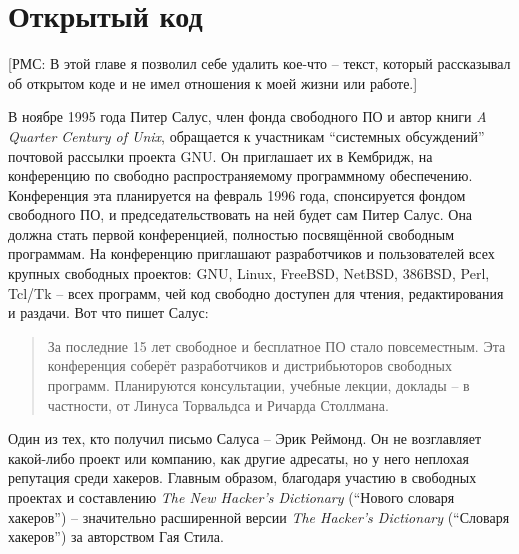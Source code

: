 

\chapter{Открытый код} \label{chapter:open source}

[РМС: В этой главе я позволил себе удалить кое-что -- текст, который рассказывал об открытом коде и не имел отношения к моей жизни или работе.]

В ноябре 1995 года Питер Салус, член фонда свободного ПО и автор книги \textit{A Quarter Century of Unix}, обращается к участникам ``системных обсуждений'' почтовой рассылки проекта GNU. Он приглашает их в Кембридж, на конференцию по свободно распространяемому программному обеспечению. Конференция эта планируется на февраль 1996 года, спонсируется фондом свободного ПО, и председательствовать на ней будет сам Питер Салус. Она должна стать первой конференцией, полностью посвящённой свободным программам. На конференцию приглашают разработчиков и пользователей всех крупных свободных проектов: GNU, Linux, FreeBSD, NetBSD, 386BSD, Perl, Tcl/Tk -- всех программ, чей код свободно доступен для чтения, редактирования и раздачи. Вот что пишет Салус:

\begin{quote}
За последние 15 лет свободное и бесплатное ПО стало повсеместным. Эта конференция соберёт разработчиков и дистрибьюторов свободных программ. Планируются консультации, учебные лекции, доклады -- в частности, от Линуса Торвальдса и Ричарда Столлмана.
\end{quote}

Один из тех, кто получил письмо Салуса -- Эрик Реймонд. Он не возглавляет какой-либо проект или компанию, как другие адресаты, но у него неплохая репутация среди хакеров. Главным образом, благодаря участию в свободных проектах и составлению \textit{The New Hacker's Dictionary} (``Нового словаря хакеров'')  -- значительно расширенной версии \textit{The Hacker's Dictionary} (``Словаря хакеров'') за авторством Гая Стила.

